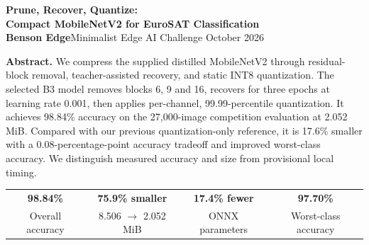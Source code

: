 \documentclass[10pt,letterpaper]{article}
\begin{document}
\begin{center}
{\LARGE\bfseries\color{navy} Prune, Recover, Quantize:\\[3pt] Compact MobileNetV2 for EuroSAT Classification}\\[6pt]
{\small\textbf{Benson Edge}\quad\textbullet\quad Minimalist Edge AI Challenge\quad\textbullet{} October 2026}
\end{center}
\vspace{-5pt}
\noindent\textbf{Abstract.} We compress the supplied distilled MobileNetV2 through residual-block removal, teacher-assisted recovery, and static INT8 quantization. The selected B3 model removes blocks 6, 9 and 16, recovers for three epochs at learning rate 0.001, then applies per-channel, 99.99-percentile quantization. It achieves 98.84\% accuracy on the 27,000-image competition evaluation at 2.052 MiB. Compared with our previous quantization-only reference, it is 17.6\% smaller with a 0.08-percentage-point accuracy tradeoff and improved worst-class accuracy. We distinguish measured accuracy and size from provisional local timing.
\begin{center}
\setlength{\fboxsep}{8pt}
\colorbox{pale}{\begin{minipage}{0.955\textwidth}\centering\sffamily
\begin{tabular*}{\linewidth}{@{\extracolsep{\fill}}cccc@{}}
\textbf{\large\color{teal}98.84\%} & \textbf{\large\color{teal}75.9\% smaller} & \textbf{\large\color{teal}17.4\% fewer} & \textbf{\large\color{teal}97.70\%}\\
\small Overall accuracy & \small 8.506 $\to$ 2.052 MiB & \small ONNX parameters & \small Worst-class accuracy
\end{tabular*}\end{minipage}}
\end{center}
\end{document}

